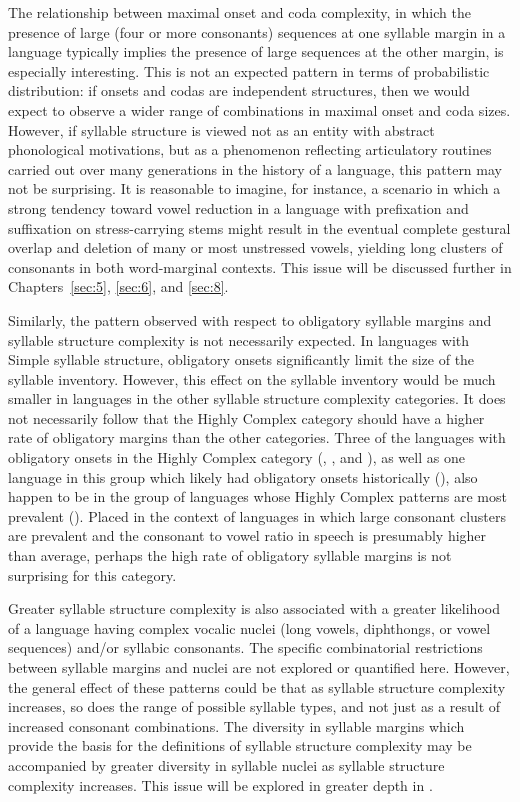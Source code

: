 The relationship between maximal onset and coda complexity, in which the presence of large (four or more consonants) sequences at one syllable margin in a language typically implies the presence of large sequences at the other margin, is especially interesting. This is not an expected pattern in terms of probabilistic distribution: if onsets and codas are independent structures, then we would expect to observe a wider range of combinations in maximal onset and coda sizes. However, if syllable structure is viewed not as an entity with abstract phonological motivations, but as a phenomenon reflecting articulatory routines carried out over many generations in the history of a language, this pattern may not be surprising. It is reasonable to imagine, for instance, a scenario in which a strong tendency toward vowel reduction in a language with prefixation and suffixation on stress-carrying stems might result in the eventual complete gestural overlap and deletion of many or most unstressed vowels, yielding long clusters of consonants in both word-marginal contexts. This issue will be discussed further in Chapters~\ref{sec:5}, \ref{sec:6}, and \ref{sec:8}.

Similarly, the pattern observed with respect to obligatory syllable margins and syllable structure complexity is not necessarily expected. In languages with Simple syllable structure, obligatory onsets significantly limit the size of the syllable inventory. However, this effect on the syllable inventory would be much smaller in languages in the other syllable structure complexity categories. It does not necessarily follow that the Highly Complex category should have a higher rate of obligatory margins than the other categories. Three of the languages with obligatory onsets in the Highly Complex category (, , and ), as well as one language in this group which likely had obligatory onsets historically (), also happen to be in the group of languages whose Highly Complex patterns are most prevalent (). Placed in the context of languages in which large consonant clusters are prevalent and the consonant to vowel ratio in speech is presumably higher than average, perhaps the high rate of obligatory syllable margins is not surprising for this category.

Greater syllable structure complexity is also associated with a greater likelihood of a language having complex vocalic nuclei (long vowels, diphthongs, or vowel sequences) and/or syllabic consonants. The specific combinatorial restrictions between syllable margins and nuclei are not explored or quantified here. However, the general effect of these patterns could be that as syllable structure complexity increases, so does the range of possible syllable types, and not just as a result of increased consonant combinations. The diversity in syllable margins which provide the basis for the definitions of syllable structure complexity may be accompanied by greater diversity in syllable nuclei as syllable structure complexity increases. This issue will be explored in greater depth in .

